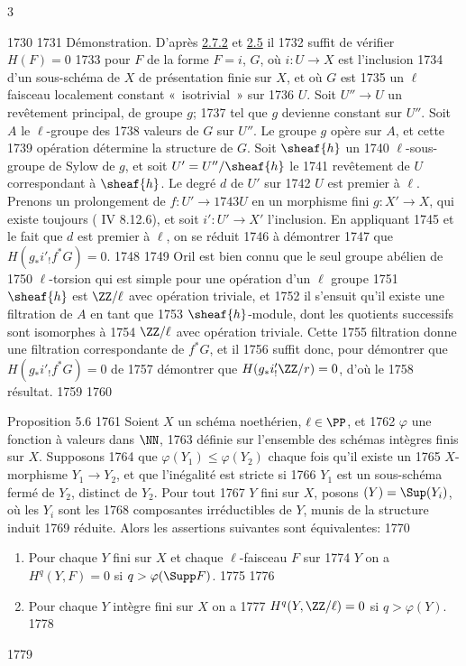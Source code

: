 3	\documentclass[10pt]{../fichiers-configuration-latex/smfart}
\begin{document}
  1730	
  1731	Démonstration. D'après \hyperref[IX.cor2.7.2]{2.7.2} et \hyperref[IX.prop2.5]{2.5} il
  1732	suffit de vérifier $H(F)=0$
  1733	pour $F$ de la forme $F=i$, $G$, où $i:U\rightarrow X$ est l'inclusion
  1734	d'un sous-schéma de $X$ de présentation finie sur $X$, et où $G$ est
  1735	un $\ell$ faisceau localement constant « isotrivial »  sur
  1736	$U$. Soit $U''\rightarrow U$ un revêtement principal, de groupe $g$;
  1737	tel que $g$ devienne constant sur $U''$. Soit $A$ le $\ell$-groupe des
  1738	valeurs de $G$ sur $U''$. Le groupe $g$ opère sur $A$, et cette
  1739	opération détermine la structure de $G$. Soit $\sheaf{h}$ un
  1740	$\ell$-sous-groupe de Sylow de $g$, et soit $U'=U''/\sheaf{h}$ le
  1741	revêtement de $U$ correspondant à $\sheaf{h}$. Le degré $d$ de $U'$ sur
  1742	$U$ est premier à $\ell$. Prenons un prolongement de $f:U'\rightarrow
  1743	U$ en un morphisme fini $g:X'\rightarrow X$, qui existe toujours (	IV 8.12.6), et soit $i':U'\rightarrow X'$ l'inclusion. En appliquant
  1745	 et le fait que $d$ est premier à $\ell$, on se réduit
  1746	à démontrer
  1747	que $H(g_{\ast}i'_{!}f^{\ast} G)=0$.
  1748	
  1749	Or\pageoriginale il est bien connu que le seul groupe abélien de
  1750	$\ell$-torsion qui est simple pour une opération d'un $\ell$ groupe
  1751	$\sheaf{h}$ est $\ZZ/\ell$ avec opération triviale, et
  1752	il s'ensuit qu'il existe une filtration de $A$ en tant que
  1753	$\sheaf{h}$-module, dont les quotients successifs sont isomorphes à
  1754	$\ZZ/\ell$ avec opération triviale. Cette
  1755	filtration donne une filtration correspondante de $f^{\ast} G$, et il
  1756	suffit donc, pour démontrer que $H(g_{\ast}i'_{!} f^{\ast} G)=0$ de
  1757	démontrer que $H(g_{\ast}i'_{!}\ZZ/r)=0$, d'où le
  1758	résultat.
  1759	
  1760	\begin{enonce*}{Proposition 5.6}
  1761	Soient $X$ un schéma noethérien, $\ell \in \PP$, et
  1762	$\varphi$ une fonction à valeurs dans $\NN$,
  1763	définie sur l'ensemble des schémas intègres finis sur $X$. Supposons
  1764	que $\varphi(Y_1)\leq \varphi(Y_2)$ chaque fois qu'il existe un
  1765	$X$-morphisme $Y_1\rightarrow Y_2$, et que l'inégalité est stricte si
  1766	$Y_1$ est un sous-schéma fermé de $Y_2$, distinct de $Y_2$. Pour tout
  1767	$Y$ fini sur $X$, posons $(Y)=\Sup (Y_i)$, où les $Y_i$ sont les
  1768	composantes irréductibles de $Y$, munis de la structure induit
  1769	réduite. Alors les assertions suivantes sont équivalentes:
  1770	\begin{enumerate}
  1771	\renewcommand{\theenumi}{\roman{enumi}}
  1772	\renewcommand{\labelenumi}{(\theenumi)}
  1773	\item Pour chaque $Y$ fini sur $X$ et chaque $\ell$-faisceau $F$ sur
  1774	$Y$ on a $H^q(Y,F)=0$ si $q>\varphi(\Supp F)$.
  1775	
  1776	\item Pour chaque $Y$ intègre fini sur $X$ on a
  1777	$H^q(Y,\ZZ/\ell)=0$ si $q>\varphi(Y)$.
  1778	\end{enumerate}
  1779	\end{enonce*}
\end{document}
